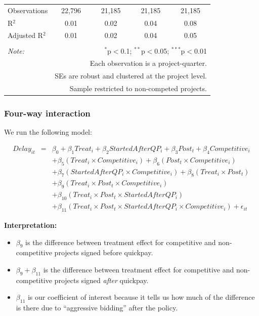 \documentclass[
]{article}
\providecommand{\tightlist}{%
  \setlength{\itemsep}{0pt}\setlength{\parskip}{0pt}}
\begin{document}
\begin{table}[H]
\begin{tabular}{@{\extracolsep{-2pt}}lcccc}
Observations & 22,796 & 21,185 & 21,185 & 21,185 \\ 
R$^{2}$ & 0.01 & 0.02 & 0.04 & 0.08 \\ 
Adjusted R$^{2}$ & 0.01 & 0.02 & 0.04 & 0.05 \\ 
\hline 
\hline \\[-1.8ex] 
\textit{Note:}  & \multicolumn{4}{r}{$^{*}$p$<$0.1; $^{**}$p$<$0.05; $^{***}$p$<$0.01} \\ 
 & \multicolumn{4}{r}{Each observation is a project-quarter.} \\ 
 & \multicolumn{4}{r}{SEs are robust and clustered at the project level.} \\ 
 & \multicolumn{4}{r}{Sample restricted to non-competed projects.} \\ 
\end{tabular} 
\end{table}

\hypertarget{four-way-interaction}{%
\subsubsection{Four-way interaction}\label{four-way-interaction}}

We run the following model:

\[\begin{aligned} Delay_{it} &=& \beta_0 +\beta_1 Treat_i+ \beta_2 StartedAfterQP_i+ \beta_3 Post_t+ \beta_4 Competitive_i\\ && +  \beta_5 (Treat_i \times Competitive_i) + \beta_6 (Post_t \times Competitive_i)\\ && +  \beta_7 (StartedAfterQP_i \times Competitive_i) +\beta_8 (Treat_i \times Post_t)\\ && + \beta_9 (Treat_i \times Post_t \times Competitive_i) \\ && + \beta_{10} (Treat_i \times Post_t \times StartedAfterQP_i )\\ && + \beta_{11} (Treat_i \times Post_t \times StartedAfterQP_i \times Competitive_i) + \epsilon_{it} \end{aligned}\]

\textbf{Interpretation:}

\begin{itemize}
\tightlist
\item
  \(\beta_9\) is the difference between treatment effect for competitive
  and non-competitive projects signed before quickpay.
\item
  \(\beta_9 + \beta_{11}\) is the difference between treatment effect
  for competitive and non-competitive projects signed \emph{after}
  quickpay.
\item
  \(\beta_{11}\) is our coefficient of interest because it tells us how
  much of the difference is there due to ``aggressive bidding'' after
  the policy.
\end{itemize}
\end{document}
